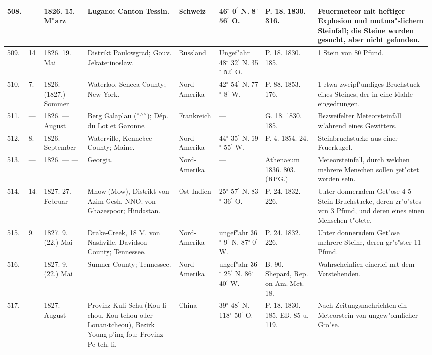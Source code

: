 \documentclass[a4paper, 8pt, oneside, polutonikogreek, german]{article}
\begin{document}
\begin{center}
\begin{longtable}{| p{4mm} | p{2mm} | p{15mm} | p{25mm} | p{16mm} | p{12mm} | p{13mm} | p{20mm} |}
        508. & --- & 1826. 15. M"arz & Lugano; Canton Tessin. & Schweiz & 46$^\circ$ 0$^\prime$ N. 8$^\circ$ 56$^\prime$ O. & P. 18. 1830. 316. & Feuermeteor mit heftiger Explosion und mutma"slichem Steinfall; die Steine wurden gesucht, aber nicht gefunden. \\ \hline
        509. & 14. & 1826. 19. Mai & Distrikt Paulowgrad; Gouv. Jekaterinoslaw. & Russland & Ungef"ahr 48$^\circ$ 32$^\prime$ N. 35$^\circ$ 52$^\prime$ O. & P. 18. 1830. 185. & 1 Stein von 80 Pfund. \\ \hline
        510. & 7. & 1826. (1827.) Sommer & Waterloo, Seneca-County; New-York. & Nord-Amerika & 42$^\circ$ 54$^\prime$ N. 77$^\circ$ 8$^\prime$ W. & P. 88. 1853. 176. & 1 etwa zweipf"undiges Bruchstuck eines Steines, der in eine Mahle eingedrungen. \\ \hline
        511. & --- & 1826. --- August & Berg Galaplau ($^\wedge$$^\wedge$$^\wedge$); Dép. du Lot et Garonne. & Frankreich & --- & G. 18. 1830. 185. & Bezweifelter Meteorsteinfall w"ahrend eines Gewitters. \\ \hline
        512. & 8. & 1826. --- September & Waterville, Kennebec-County; Maine. & Nord-Amerika & 44$^\circ$ 35$^\prime$ N. 69$^\circ$ 55$^\prime$ W. & P. 4. 1854. 24. & Steinbruchstucke aus einer Feuerkugel. \\ \hline
        513. & --- & 1826. --- --- & Georgia. & Nord-Amerika & --- & Athenaeum 1836. 803. (RPG.) & Meteorsteinfall, durch welchen mehrere Menschen sollen get"otet worden sein. \\ \hline
        514. & 14. & 1827. 27. Februar & Mhow (Mow), Distrikt von Azim-Gesh, NNO. von Ghazeepoor; Hindostan. & Ost-Indien & 25$^\circ$ 57$^\prime$ N. 83$^\circ$ 36$^\prime$ O. & P. 24. 1832. 226. & Unter donnerndem Get"ose 4-5 Stein-Bruchstucke, deren gr"o"stes von 3 Pfund, und deren eines einen Menschen t"otete. \\ \hline
        515. & 9. & 1827. 9. (22.) Mai & Drake-Creek, 18 M. von Nashville, Davidson-County; Tennessee. & Nord-Amerika & ungef"ahr 36$^\circ$ 9$^\prime$ N. 87$^\circ$ 0$^\prime$ W. & P. 24. 1832. 226. & Unter donnerndem Get"ose mehrere Steine, deren gr"o"ster 11 Pfund. \\ \hline
        516. & --- & 1827. 9. (22.) Mai & Sumner-County; Tennessee. & Nord-Amerika & ungef"ahr 36$^\circ$ 25$^\prime$ N. 86$^\circ$ 40$^\prime$ W. & B. 90. Shepard, Rep. on Am. Met. 18. & Wahrscheinlich einerlei mit dem Vorstehenden. \\ \hline
        517. & --- & 1827. --- August & Provinz Kuli-Schu (Kou-li-chou, Kou-tchou oder Louan-tcheou), Bezirk Young-p'ing-fou; Provinz Pe-tchi-li. & China & 39$^\circ$ 48$^\prime$ N. 118$^\circ$ 50$^\prime$ O. & P. 18. 1830. 185. EB. 85 u. 119. & Nach Zeitungsnachrichten ein Meteorstein von ungew"ohnlicher Gro"se. \\ \hline

\end{longtable}
\end{center}
\end{document}
